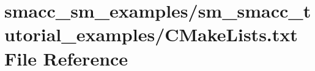 \hypertarget{smacc__sm__examples_2sm__smacc__tutorial__examples_2CMakeLists_8txt}{}\section{smacc\+\_\+sm\+\_\+examples/sm\+\_\+smacc\+\_\+tutorial\+\_\+examples/\+C\+Make\+Lists.txt File Reference}
\label{smacc__sm__examples_2sm__smacc__tutorial__examples_2CMakeLists_8txt}
